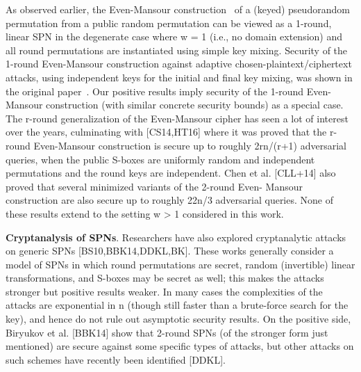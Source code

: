 As observed earlier, the Even-Mansour construction~\cite{JC:EveMan97} of a (keyed) pseudorandom permutation from a public random permutation can be viewed
as a 1-round, linear SPN in the degenerate case where w = 1 (i.e., no domain
extension) and all round permutations are instantiated using simple key mixing.
Security of the 1-round Even-Mansour construction against adaptive chosen-plaintext/ciphertext attacks, using independent keys for the initial and final key mixing, was shown in the original paper~\cite{JC:EveMan97}. Our positive results imply
security of the 1-round Even-Mansour construction (with similar concrete security
bounds) as a special case. The r-round generalization of the Even-Mansour
cipher has seen a lot of interest over the years, culminating with [CS14,HT16]
where it was proved that the r-round Even-Mansour construction is secure up to
roughly 2rn/(r+1) adversarial queries, when the public S-boxes are uniformly random
and independent permutations and the round keys are independent. Chen et
al. [CLL+14] also proved that several minimized variants of the 2-round Even-
Mansour construction are also secure up to roughly 22n/3 adversarial queries.
None of these results extend to the setting w > 1 considered in this work.





{\bf Cryptanalysis of SPNs}. Researchers have also explored cryptanalytic attacks
on generic SPNs [BS10,BBK14,DDKL,BK]. These works generally consider a
model of SPNs in which round permutations are secret, random (invertible) linear
transformations, and S-boxes may be secret as well; this makes the attacks
stronger but positive results weaker. In many cases the complexities of the
attacks are exponential in n (though still faster than a brute-force search for
the key), and hence do not rule out asymptotic security results. On the positive
side, Biryukov et al. [BBK14] show that 2-round SPNs (of the stronger form just
mentioned) are secure against some specific types of attacks, but other attacks
on such schemes have recently been identified [DDKL].






